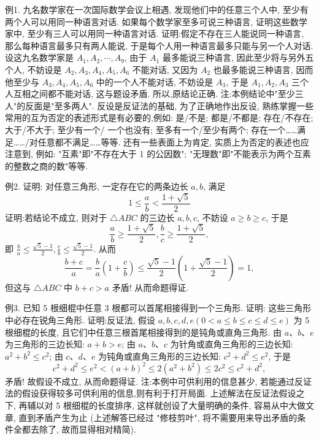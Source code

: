 
例1. 九名数学家在一次国际数学会议上相遇, 发现他们中的任意三个人中, 至少有两个人可以用同一种语言对话.
如果每个数学家至多可说三种语言, 证明这些数学家中, 至少有三人可以用同一种语言对话.
证明:假定不存在三人能说同一种语言, 那么每种语言最多只有两人能说, 于是每个人用一种语言最多只能与另一个人对话.
设这九名数学家是 $A_1, A_2, \cdots, A_9$, 由于 $A_1$ 最多能说三种语言, 因此至少将与另外五个人, 不妨设是 $A_2, A_3, A_4, A_5, A_6$ 不能对话, 又因为 $A_2$ 也最多能说三种语言, 因而他至少与 $A_3, A_4, A_5, A_6$ 中的一个人不能对话, 不妨设是 $A_3$, 于是 $A_1, A_2, A_3$ 三个人互相之间都不能对话, 这与题设矛盾.
所以,原结论正确.
注:本例结论中"至少三人"的反面是"至多两人". 反设是反证法的基础, 为了正确地作出反设, 熟练掌握一些常用的互为否定的表述形式是有必要的,例如: 是/不是; 都是/不都是; 存在/不存在; 大于/不大于; 至少有一个/ 一个也没有; 至多有一个/至少有两个; 存在一个……满足……/对任意都不满足……等等.
还有一些表面上为肯定, 实质上为否定的表述也应注意到, 例如: "互素"即"不存在大于 1 的公因数"; "无理数"即"不能表示为两个互素的整数之商的数"等等.



例2. 证明: 对任意三角形, 一定存在它的两条边长 $a, b$, 满足
$$
1 \leqslant \frac{a}{b}<\frac{1+\sqrt{5}}{2}
$$
证明:若结论不成立, 则对于 $\triangle A B C$ 的三边长 $a, b, c$, 不妨设 $a \geqslant b \geqslant c$, 于是
$$
\frac{a}{b} \geqslant \frac{1+\sqrt{5}}{2}, \frac{b}{c} \geqslant \frac{1+\sqrt{5}}{2},
$$
即 $\frac{b}{a} \leqslant \frac{\sqrt{5}-1}{2}, \frac{c}{b} \leqslant \frac{\sqrt{5}-1}{2}$.
从而
$$
\frac{b+c}{a}=\frac{b}{a}\left(1+\frac{c}{b}\right) \leqslant \frac{\sqrt{5}-1}{2}\left(1+\frac{\sqrt{5}-1}{2}\right)=1,
$$
但这与 $\triangle A B C$ 中 $b+c>a$ 矛盾! 从而命题得证.



例3. 已知 5 根细棍中任意 3 根都可以首尾相接得到一个三角形.
证明: 这些三角形中必存在锐角三角形.
证明:反证法, 假设 $a, b, c, d, e(0<a \leqslant b \leqslant c \leqslant d \leqslant e)$ 为 5 根细棍的长度, 且它们中任意三根首尾相接得到的是钝角或直角三角形.
由 $a 、 b 、 e$ 为三角形的三边长知: $a+b>e$;
由 $a 、 b 、 c$ 为针角或直角三角形的三边长知: $a^2+b^2 \leqslant c^2$;
由 $c 、 d 、 e$ 为钝角或直角三角形的三边长知: $c^2+d^2 \leqslant e^2$, 于是
$$
c^2+d^2 \leqslant e^2<(a+b)^2 \leqslant 2\left(a^2+b^2\right) \leqslant 2 c^2 \leqslant c^2+d^2,
$$
矛盾!
故假设不成立, 从而命题得证.
注:本例中可供利用的信息甚少, 若能通过反证法的假设获得较多可供利用的信息,则有利于打开局面.
上述解法在反证法假设之下, 再辅以对 5 根细棍的长度排序, 这样就创设了大量明确的条件, 容易从中大做文章, 直到矛盾产生为止 (上述解答已经过 "修枝剪叶", 将不需要用来导出矛盾的条件全都去除了, 故而显得相对精简).



